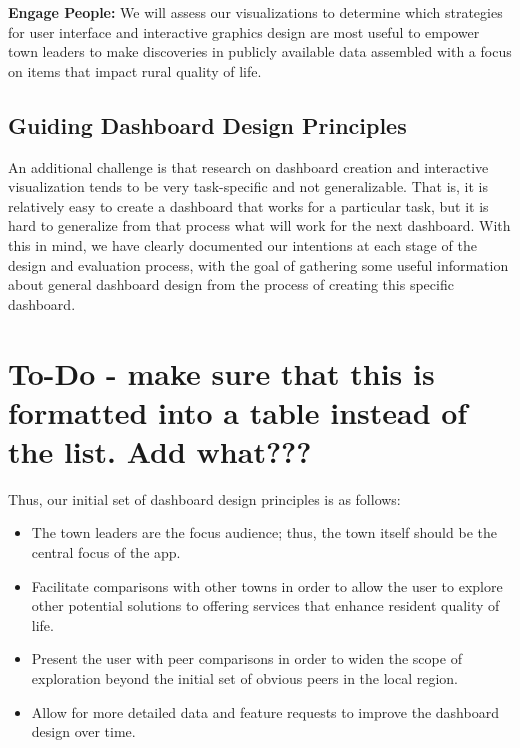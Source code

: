 \documentclass[letterpaper,inpress]{jdsart}
\begin{document}
\textbf{Engage People:}
We will assess our visualizations to determine which strategies for user interface and interactive graphics design are most useful to empower town leaders to make discoveries in publicly available data assembled with a focus on items that impact rural quality of life.

\subsection{Guiding Dashboard Design Principles}

An additional challenge is that research on dashboard creation and interactive visualization tends to be very task-specific and not generalizable. That is, it is relatively easy to create a dashboard that works for a particular task, but it is hard to generalize from that process what will work for the next dashboard. With this in mind, we have clearly documented our intentions at each stage of the design and evaluation process, with the goal of gathering some useful information about general dashboard design from the process of creating this specific dashboard.

\hypertarget{to-do---make-sure-that-this-is-formatted-into-a-table-instead-of-the-list.-add-what}{%
\section{To-Do - make sure that this is formatted into a table instead of the list. Add what???}\label{to-do---make-sure-that-this-is-formatted-into-a-table-instead-of-the-list.-add-what}}

Thus, our initial set of dashboard design principles is as follows:

\begin{itemize}
\item The town leaders are the focus audience; thus, the town itself should be the central focus of the app.
\item Facilitate comparisons with other towns in order to allow the user to explore other potential solutions to offering services that enhance resident quality of life.
\item Present the user with peer comparisons in order to widen the scope of exploration beyond the initial set of obvious peers in the local region.
\item Allow for more detailed data and feature requests to improve the dashboard design over time.
\end{itemize}
\end{document}
